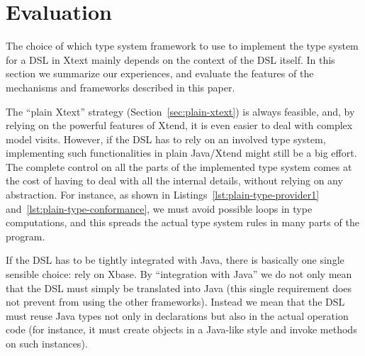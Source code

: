 \section{Evaluation}
\label{sec:evaluation}




The choice of which type system framework to use to implement the type system
for a DSL in Xtext mainly depends on the context of the DSL itself.  In this
section we summarize our experiences, and evaluate the features of the
mechanisms and frameworks described in this paper.

The ``plain Xtext'' strategy (Section~\ref{sec:plain-xtext}) is always feasible,
and, by relying on the powerful features of Xtend, it is even easier to deal
with complex model visits.  However, if the DSL has to rely on an involved type
system, implementing such functionalities in plain Java/Xtend might still be a
big effort.  The complete control on all the parts of the implemented type
system comes at the cost of having to deal with all the internal details,
without relying on any abstraction.  For instance, as shown in
Listings~\ref{lst:plain-type-provider1} and~\ref{lst:plain-type-conformance},
we must avoid possible loops in type computations, and this spreads the actual type system rules in many parts of the
program.

If the DSL has to be tightly integrated with Java, there is basically one single
sensible choice: rely on Xbase.  By ``integration with Java'' we do not only
mean that the DSL must simply be translated into Java (this single requirement does not
prevent from using the other frameworks).  Instead we mean that the DSL must
reuse Java types not only in declarations but also in the actual operation code
(for instance, it must create objects in a Java-like style and invoke methods on
such instances).

